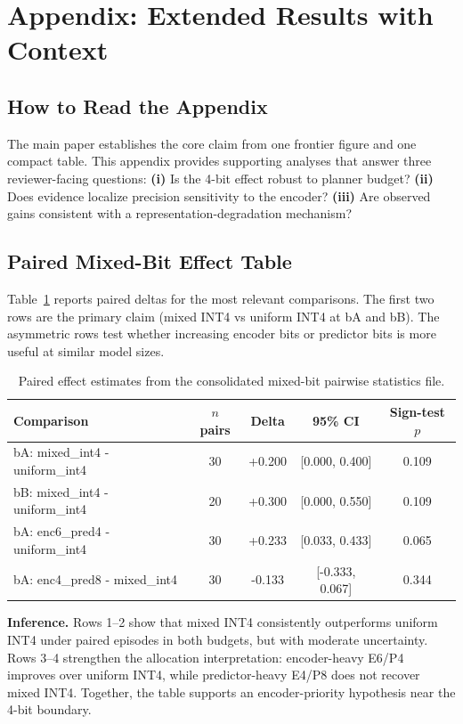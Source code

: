 \documentclass{article}
\begin{document}



\appendix
\clearpage
\section{Appendix: Extended Results with Context}

\subsection{How to Read the Appendix}
The main paper establishes the core claim from one frontier figure and one compact table.
This appendix provides supporting analyses that answer three reviewer-facing questions:
\textbf{(i)} Is the 4-bit effect robust to planner budget?
\textbf{(ii)} Does evidence localize precision sensitivity to the encoder?
\textbf{(iii)} Are observed gains consistent with a representation-degradation mechanism?

\subsection{Paired Mixed-Bit Effect Table}
Table~\ref{tab:paired} reports paired deltas for the most relevant comparisons.
The first two rows are the primary claim (mixed INT4 vs uniform INT4 at bA and bB).
The asymmetric rows test whether increasing encoder bits or predictor bits is more useful at similar model sizes.

\begin{table}[h]
\centering
\small
\begin{tabular}{lcccc}
\toprule
Comparison & $n$ pairs & Delta & 95\% CI & Sign-test $p$ \\
\midrule
bA: mixed\_int4 - uniform\_int4 & 30 & +0.200 & [0.000, 0.400] & 0.109 \\
bB: mixed\_int4 - uniform\_int4 & 20 & +0.300 & [0.000, 0.550] & 0.109 \\
bA: enc6\_pred4 - uniform\_int4 & 30 & +0.233 & [0.033, 0.433] & 0.065 \\
bA: enc4\_pred8 - mixed\_int4 & 30 & -0.133 & [-0.333, 0.067] & 0.344 \\
\bottomrule
\end{tabular}
\caption{Paired effect estimates from the consolidated mixed-bit pairwise statistics file.}
\label{tab:paired}
\end{table}

\noindent\textbf{Inference.}
Rows 1--2 show that mixed INT4 consistently outperforms uniform INT4 under paired episodes in both budgets, but with moderate uncertainty.
Rows 3--4 strengthen the allocation interpretation: encoder-heavy E6/P4 improves over uniform INT4, while predictor-heavy E4/P8 does not recover mixed INT4.
Together, the table supports an encoder-priority hypothesis near the 4-bit boundary.
\end{document}
